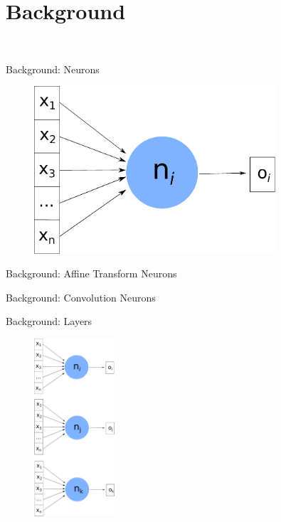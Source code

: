 \documentclass[xcolor=dvipsnames]{beamer}
\begin{document}
\section{Background}

{
\begin{frame}
    \centering
    \textcolor{white}{\LARGE Background}
\end{frame}
}

\begin{frame}{Background: Neurons}

\begin{figure}
    \centering
    \includegraphics[width=0.8\textwidth]{images/neuron.pdf}
\end{figure}

\end{frame}


\begin{frame}{Background: Affine Transform Neurons}



\end{frame}

\begin{frame}{Background: Convolution Neurons}
\centering
{}
\end{frame}

\begin{frame}{Background: Layers}

\begin{figure}
    \includegraphics[width=3cm]{images/layer.pdf}
\end{figure}

\end{frame}
\end{document}
